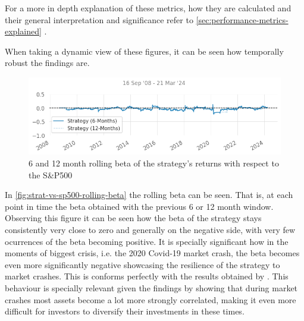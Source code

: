 For a more in depth explanation of these metrics, how they are calculated and their general interpretation and significance refer to \autoref{sec:performance-metrics-explained} .

When taking a dynamic view of these figures, it can be seen how temporally robust the findings are.

\begin{figure}[ht]
    \includegraphics[width=\linewidth]{assets/strat-vs-sp500-rolling-beta.png}
    \caption{6 and 12 month rolling beta of the strategy's returns with respect to the S\&P500}
    \label{fig:strat-vs-sp500-rolling-beta}
\end{figure}

In \autoref{fig:strat-vs-sp500-rolling-beta} the rolling beta can be seen. That is, at each point in time the beta obtained with the previous 6 or 12 month window. Observing this figure it can be seen how the beta of the strategy stays consistently very close to zero and generally on the negative side, with very few ocurrences of the beta becoming positive. It is specially significant how in the moments of biggest crisis, i.e. the 2020 Covid-19 market crash, the beta becomes even more significantly negative showcasing the resilience of the strategy to market crashes. This is conforms perfectly with the results obtained by \cite{ioannis_2023}. This behaviour is specially relevant given the findings by \cite{sandoval_franca_2012} showing that during market crashes most assets become a lot more strongly correlated, making it even more difficult for investors to diversify their investments in these times. 

